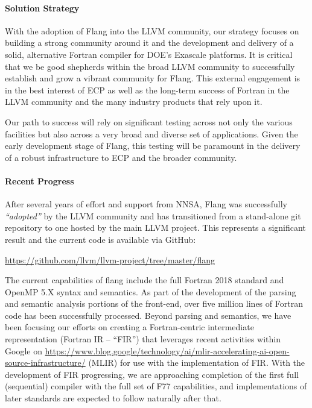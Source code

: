 \paragraph{Solution Strategy}

With the adoption of Flang into the LLVM community, our strategy
focuses on building a strong community around it and the development
and delivery of a solid, alternative Fortran compiler for DOE's
Exascale platforms.  It is critical that we be good shepherds within
the broad LLVM community to successfully establish and grow a vibrant
community for Flang. This external engagement is in the best interest
of ECP as well as the long-term success of Fortran in the LLVM
community and the many industry products that rely upon it.

Our path to success will rely on significant testing across not only
the various facilities but also across a very broad and diverse set of
applications. Given the early development stage of Flang, this testing
will be paramount in the delivery of a robust infrastructure to ECP
and the broader community.

\paragraph{Recent Progress}

After several years of effort and support from NNSA, Flang was 
successfully \emph{``adopted''} by the LLVM community and has transitioned 
from a stand-alone git repository to one hosted by the main LLVM project.  This 
represents a significant result and the current code is available via GitHub:

\begin{center}
\url{https://github.com/llvm/llvm-project/tree/master/flang}
\end{center}

The current capabilities of flang include the full Fortran 2018
standard and OpenMP 5.X syntax and semantics.  As part of the
development of the parsing and semantic analysis portions of the
front-end, over five million lines of Fortran code has been
successfully processed. Beyond parsing and semantics, we have been
focusing our efforts on creating a Fortran-centric intermediate 
representation (Fortran IR -- ``FIR'') that leverages recent activities 
within Google on 
\href{Multi-Level Intermediate Representations} 
{https://www.blog.google/technology/ai/mlir-accelerating-ai-open-source-infrastructure/}
(MLIR) for use with the implementation of FIR.
With the development of FIR progressing, we are approaching completion of 
the first full (sequential) compiler with the full set of F77 
capabilities, and implementations of later standards are expected to 
follow naturally after that.

